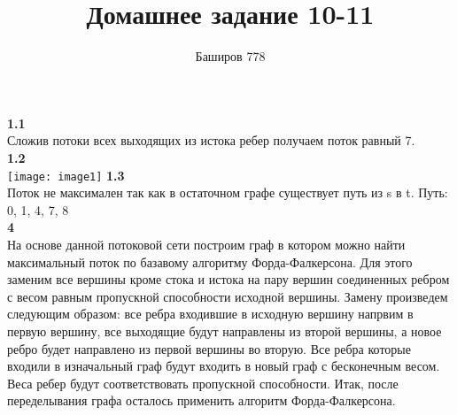 \documentclass[a4paper,12pt]{article}
\author{Баширов 778}
\title{Домашнее задание 10-11}
\begin{document}
\maketitle
\newpage
\noindent \large\textbf{1.1}\normalsize\\
Сложив потоки всех выходящих из истока ребер получаем поток равный 7.\\
\large\textbf{1.2}\normalsize\\
\texttt{[image: image1]}
\large\textbf{1.3}\normalsize\\
Поток не максимален так как в остаточном графе существует путь из s в t. Путь: 0, 1, 4, 7, 8\\
\large\textbf{4}\normalsize\\
На основе данной потоковой сети построим граф в котором можно найти максимальный поток по базавому алгоритму Форда-Фалкерсона. Для этого заменим все вершины кроме стока и истока на пару вершин соединенных ребром с весом равным пропускной способности исходной вершины. Замену произведем следующим образом: все ребра входившие в исходную вершину напрвим в первую вершину, все выходящие будут направлены из второй вершины, а новое ребро будет направлено из первой вершины во вторую. Все ребра которые входили в изначальный граф будут входить в новый граф с бесконечным весом. Веса ребер будут соответствовать пропускной способности. Итак, после переделывания графа осталось применить алгоритм Форда-Фалкерсона.\\
\end{document}
